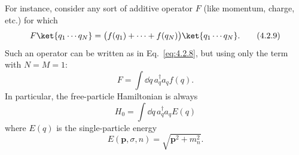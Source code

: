 For instance, consider any sort of additive operator $F$ (like momentum,
charge, etc.) for which
\begin{equation}
  F\ket{q_1\cdots q_N}
  =\bigl(f(q_1)+\cdots+f(q_N)\bigr)\ket{q_1\cdots q_N}.
  \tag{4.2.9}
  \label{eq:4.2.9}
\end{equation}
Such an operator can be written as in Eq.~\eqref{eq:4.2.8}, but using only the term
with $N=M=1$:
\begin{equation}
  F=\int \dd q\,a^\dagger_q a_q f(q).
  \tag{4.2.10}
  \label{eq:4.2.10}
\end{equation}
In particular, the free-particle Hamiltonian is always
\begin{equation}
  H_0=\int \dd q\,a^\dagger_q a_q E(q)
  \tag{4.2.11}
  \label{eq:4.2.11}
\end{equation}
where $E(q)$ is the single-particle energy
\[
  E(\mathbf p,\sigma,n)=\sqrt{\mathbf p^2+m_n^2}.
\]

